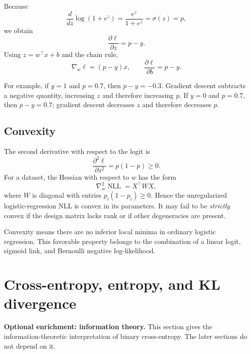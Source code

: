 \documentclass[11pt]{article}
\newcommand{\sigmoid}{\sigma}
\theoremstyle{definition}
\begin{document}
Because
\[
\frac{d}{dz}\log(1+e^z)=\frac{e^z}{1+e^z}=\sigmoid(z)=p,
\]
we obtain
\begin{equation}
\boxed{\frac{\partial\ell}{\partial z}=p-y.}
\label{eq:gradient-logit}
\end{equation}
Using $z=w^\top x+b$ and the chain rule,
\begin{equation}
\nabla_w\ell=(p-y)x,
\qquad
\frac{\partial\ell}{\partial b}=p-y.
\label{eq:gradient-parameters}
\end{equation}

For example, if $y=1$ and $p=0.7$, then $p-y=-0.3$. Gradient descent subtracts a negative quantity, increasing $z$ and therefore increasing $p$. If $y=0$ and $p=0.7$, then $p-y=0.7$; gradient descent decreases $z$ and therefore decreases $p$.

\subsection{Convexity}

The second derivative with respect to the logit is
\begin{equation}
\frac{\partial^2\ell}{\partial z^2}=p(1-p)\ge0.
\label{eq:second-derivative}
\end{equation}
For a dataset, the Hessian with respect to $w$ has the form
\[
\nabla_w^2\operatorname{NLL}=X^\top W X,
\]
where $W$ is diagonal with entries $p_i(1-p_i)\ge0$. Hence the unregularized logistic-regression NLL is convex in its parameters. It may fail to be \emph{strictly} convex if the design matrix lacks rank or if other degeneracies are present.

Convexity means there are no inferior local minima in ordinary logistic regression. This favorable property belongs to the combination of a linear logit, sigmoid link, and Bernoulli negative log-likelihood.

\section[Cross-entropy, entropy, and KL divergence (optional)]{Cross-entropy, entropy, and KL divergence}
\label{sec:information-theory}

\begin{tcolorbox}[
  colback=lightgray,
  colframe=blue!55,
  boxrule=0.45pt,
  arc=1.5pt,
  left=6pt,right=6pt,top=4pt,bottom=4pt
]
\small
\textbf{\color{navy}Optional enrichment: information theory.}
This section gives the information-theoretic interpretation of binary cross-entropy. The later sections do not depend on it.
\end{tcolorbox}
\end{document}
